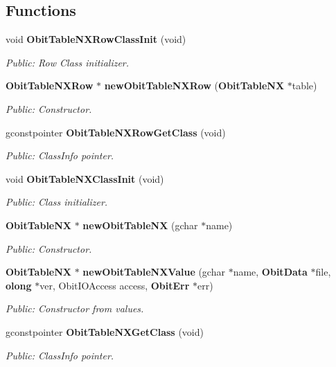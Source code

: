 \subsection*{Functions}
\begin{CompactItemize}
\item 
void {\bf Obit\-Table\-NXRow\-Class\-Init} (void)
\begin{CompactList}\small\item\em Public: Row Class initializer. \item\end{CompactList}\item 
{\bf Obit\-Table\-NXRow} $\ast$ {\bf new\-Obit\-Table\-NXRow} ({\bf Obit\-Table\-NX} $\ast$table)
\begin{CompactList}\small\item\em Public: Constructor. \item\end{CompactList}\item 
gconstpointer {\bf Obit\-Table\-NXRow\-Get\-Class} (void)
\begin{CompactList}\small\item\em Public: Class\-Info pointer. \item\end{CompactList}\item 
void {\bf Obit\-Table\-NXClass\-Init} (void)
\begin{CompactList}\small\item\em Public: Class initializer. \item\end{CompactList}\item 
{\bf Obit\-Table\-NX} $\ast$ {\bf new\-Obit\-Table\-NX} (gchar $\ast$name)
\begin{CompactList}\small\item\em Public: Constructor. \item\end{CompactList}\item 
{\bf Obit\-Table\-NX} $\ast$ {\bf new\-Obit\-Table\-NXValue} (gchar $\ast$name, {\bf Obit\-Data} $\ast$file, {\bf olong} $\ast$ver, Obit\-IOAccess access, {\bf Obit\-Err} $\ast$err)
\begin{CompactList}\small\item\em Public: Constructor from values. \item\end{CompactList}\item 
gconstpointer {\bf Obit\-Table\-NXGet\-Class} (void)
\begin{CompactList}\small\item\em Public: Class\-Info pointer. \item\end{CompactList}\item 

\end{CompactItemize}
